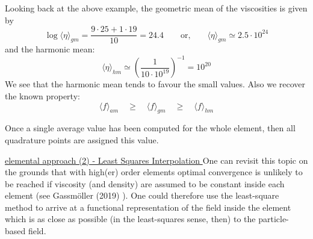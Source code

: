 Looking back at the above example, the geometric mean of the viscosities is given by 
\[
\log \langle \eta\rangle_{gm} = \frac{9\cdot 25+1\cdot 19}{10} = 24.4 
\qquad \text{or,} \qquad 
\langle \eta\rangle_{gm} \simeq 2.5 \cdot 10^{24}
\]
and the harmonic mean:
\[
\langle\eta\rangle_{hm} \simeq \left( \frac{1}{10 \cdot  10^{19}} \right)^{-1} = 10^{20}
\]
We see that the harmonic mean tends to favour the small values. Also we recover the known property:
\begin{equation}
\langle f \rangle_{am}\quad  \geq \quad
\langle f \rangle_{gm}\quad  \geq \quad
\langle f \rangle_{hm} 
\end{equation}



Once a single average value has been computed for the whole element, then 
all quadrature points are assigned this value. 


\underline{elemental approach (2) - Least Squares Interpolation } 
One can revisit this topic on the grounds that 
with high(er) order elements optimal convergence is unlikely to be reached 
if viscosity (and density) are assumed to be constant inside each element (see  
Gassm\"oller \etal (2019) \cite{galb19}). 
One could therefore use the least-square method to arrive at 
a functional representation of the field inside the element which is as 
close as possible (in the least-squares sense, then) to the particle-based field. 

